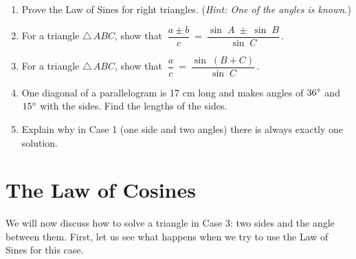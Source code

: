 {\begin{enumerate}[\bfseries 1.]
  \begin{center}\end{center}
 \item\label{exer:lawsinesright} Prove the Law of Sines for right triangles. (\emph{Hint: One of the
 angles is known.})
 \item For a triangle $\triangle\,ABC$, show that $~\dfrac{a \pm b}{c} ~=~ 
  \dfrac{\sin\;A \;\pm\; \sin\;B}{\sin\;C}\,$.
 \item For a triangle $\triangle\,ABC$, show that $~\dfrac{a}{c} ~=~\dfrac{\sin\;(B+C)}{\sin\;C}\,$.
 \item One diagonal of a parallelogram is 17 cm long and makes angles of $36^\circ$ and
  $15^\circ$ with the sides. Find the lengths of the sides.
 \item Explain why in Case 1 (one side and two angles) there is always exactly one solution.
\end{enumerate}}
\newpage
\section{The Law of Cosines}
We will now discuss how to solve a triangle in Case 3: two sides and the angle between them. First,
let us see what happens when we try to use the Law of Sines for this case.\vspace{-1mm}

